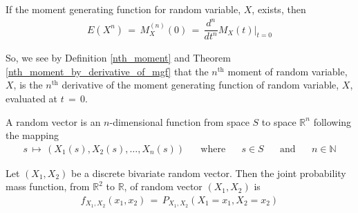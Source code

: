 \begin{theorem}
    \label{nth_moment_by_derivative_of_mgf}
    If the moment generating function for random variable, $X$, exists, then
    \begin{align*}
        E(X^{n}) \hspace{2pt} = \hspace{2pt} M_{X}^{(n)}(0) \hspace{2pt} = \hspace{2pt} \dfrac{d^{n}}{dt^{n}}M_{X}(t)\Big|_{t = 0}  
    \end{align*}
\end{theorem}

So, we see by Definition \ref{nth_moment} and Theorem \ref{nth_moment_by_derivative_of_mgf} that the $n^{\text{th}}$ moment of random variable, $X$, is the $n^{\text{th}}$ derivative of the moment generating function of random variable, $X$, evaluated at $t \hspace{2pt} = \hspace{2pt} 0$.

\begin{definition}
    A random vector is an $n$-dimensional function from space $S$ to space $\mathbb{R}^{n}$ following the mapping
    \begin{align*}
        s \hspace{2pt} \mapsto \hspace{2pt} (X_{1}(s), X_{2}(s), \dots , X_{n}(s)) \hspace{20pt} \text{where} \hspace{20pt} s \in S \hspace{20pt} \text{and} \hspace{20pt} n \in \mathbb{N}
    \end{align*}
\end{definition}

\begin{definition}
    Let $(X_{1}, X_{2})$ be a discrete bivariate random vector. Then the joint probability mass function, from $\mathbb{R}^{2}$ to $\mathbb{R}$, of random vector $(X_{1}, X_{2})$ is 
    \begin{align*}
        f_{X_{1}, X_{2}}(x_{1}, x_{2}) \hspace{2pt} = \hspace{2pt} P_{X_{1}, X_{2}}(X_{1} = x_{1}, X_{2} = x_{2})
    \end{align*}
\end{definition}

